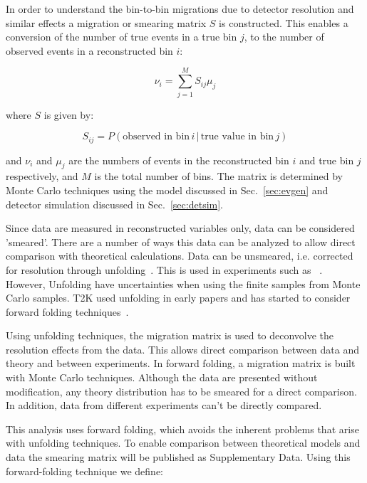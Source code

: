 
In order to understand the bin-to-bin migrations  due to detector resolution and similar effects a migration or smearing matrix $S$ is constructed. 
This enables a conversion of the number of true events in a true bin $j$, to the number of observed events in a reconstructed bin $i$:

\begin{equation}
\label{eq:smearing_matrix_2d}
\nu_i = \sum_{j=1}^{M} S_{ij} \mu_j
\end{equation}

where $S$ is given by:

\begin{equation}
S_{ij} = P(\text{observed in bin}\, i \,|\, \text{true value in bin}\, j)
\end{equation}

and $\nu_i$ and $\mu_j$ are the numbers of events in the reconstructed bin $i$ and true bin $j$ respectively, and $M$ is the total number of bins.  The matrix is determined by Monte Carlo techniques using the model discussed in Sec.~\ref{sec:evgen} and detector simulation discussed in Sec.~\ref{sec:detsim}.

Since data are measured in reconstructed variables only, data can be considered 'smeared'. There are a number of ways this data can be analyzed to allow direct comparison with theoretical calculations.
Data can be unsmeared, i.e. corrected for resolution through unfolding~\cite{DAgostini:1994fjx}. 
This is used in experiments such as \minerva~\cite{Ruterbories:2018gub}.  
However, Unfolding have uncertainties when using the finite samples from Monte Carlo samples.
T2K used unfolding in early papers and has started to consider forward folding techniques~\cite{Koch2019}.  

 Using unfolding techniques, the migration matrix is used to deconvolve the resolution effects from the data.  This allows direct comparison between data and theory and between experiments.
 In forward folding, a migration matrix is built with Monte Carlo techniques.  Although the data are presented without modification, any theory distribution has to be smeared for a direct comparison.  In addition, data from different experiments can't be directly compared.  

This analysis uses forward folding, which avoids the inherent problems that arise with unfolding techniques.
To enable comparison between theoretical models and data the smearing matrix will be published as Supplementary Data. Using this forward-folding technique we define:


